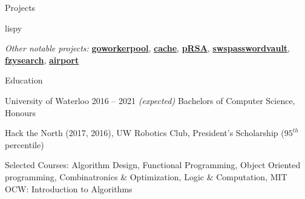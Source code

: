 \documentclass{resume} %
\begin{document}
\begin{rSection}{Projects}
\begin{rSubsection}{lispy}
  \end{rSubsection}

  \begin{rMinisection}
    \item {\em Other notable projects:}
      \href{https://github.com/ridwanmsharif/goworkerpool}{\textbf{goworkerpool}},
      \href{https://github.com/ridwanmsharif/cache}{\textbf{cache}},
      \href{https://github.com/ridwanmsharif/prsa}{\textbf{pRSA}},
      \href{https://www.ncr.com}{\textbf{swspasswordvault}},
      \href{https://github.com/ridwanmsharif/fzysearch}{\textbf{fzysearch}},
      \href{https://github.com/ridwanmsharif/airport}{\textbf{airport}}
  \end{rMinisection}
\end{rSection}


\begin{rSection}{Education}
  \begin{rSubsection}{University of Waterloo}
		     {2016 -- 2021 \em (expected)}
		     {Bachelors of Computer Science, Honours}
		     {}
    \item Hack the North (2017, 2016), UW Robotics Club, President's Scholarship
      ($95^{th}$ percentile)
    \item Selected Courses: Algorithm Design, Functional Programming, Object
      Oriented programming, Combinatronics \& Optimization, Logic \&
      Computation, MIT OCW: Introduction to Algorithms
  \end{rSubsection}
\end{rSection} 
\end{document}
